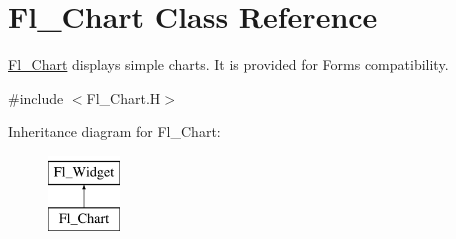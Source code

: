 \hypertarget{class_fl___chart}{}\section{Fl\+\_\+\+Chart Class Reference}
\label{class_fl___chart}


\hyperlink{class_fl___chart}{Fl\+\_\+\+Chart} displays simple charts. It is provided for Forms compatibility.  




{\ttfamily \#include $<$Fl\+\_\+\+Chart.\+H$>$}

Inheritance diagram for Fl\+\_\+\+Chart\+:\begin{figure}[H]
\begin{center}
\leavevmode
\includegraphics[height=2.000000cm]{class_fl___chart}
\end{center}
\end{figure}
